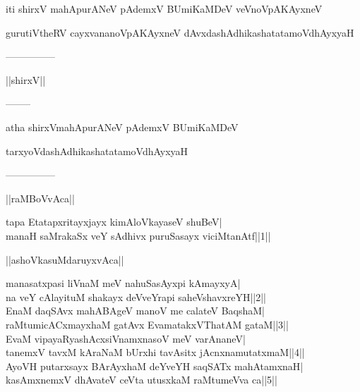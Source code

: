 \documentclass{article}
\begin{document}
\begin{center}
iti shirxV mahApurANeV pAdemxV BUmiKaMDeV veVnoVpAKAyxneV
\end{center}

\begin{center}
gurutiVtheRV cayxvananoVpAKAyxneV dAvxdashAdhikashatatamoVdhAyxyaH
\end{center}

\begin{center}
---------------
\end{center}

\begin{center}
||shirxV||
\end{center}

\begin{center}
--------
\end{center}

\begin{center}
atha shirxVmahApurANeV pAdemxV BUmiKaMDeV
\end{center}

\begin{center}
tarxyoVdashAdhikashatatamoVdhAyxyaH
\end{center}

\begin{center}
---------------
\end{center}

\begin{center}
||raMBoVvAca||
\end{center}

tapa Etatapxritayxjayx kimAloVkayaseV shuBeV|\\
manaH saMrakaSx veY sAdhivx puruSasayx viciMtanAtf||1||\\

\begin{center}
||ashoVkasuMdaruyxvAca||
\end{center}

manasatxpasi liVnaM meV nahuSasAyxpi kAmayxyA|\\
na veY cAlayituM shakayx deVveYrapi saheVshavxreYH||2||\\
EnaM daqSAvx mahABAgeV manoV me calateV BaqshaM|\\
raMtumicACxmayxhaM gatAvx EvamatakxVThatAM gataM||3||\\
EvaM vipayaRyashAcxsiVnamxnasoV meV varAnaneV|\\
tanemxV tavxM kAraNaM bUrxhi tavAsitx jAcnxnamutatxmaM||4||\\
AyoVH putarxsayx BArAyxhaM deYveYH saqSATx mahAtamxnaH|\\
kasAmxnemxV dhAvateV ceVta utusxkaM raMtumeVva ca||5||\\
\end{document}

